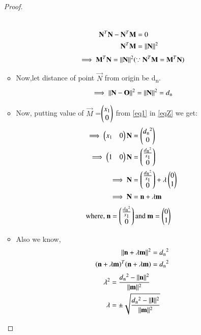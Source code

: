 \documentclass[journal,12pt,twocolumn]{IEEEtran}
\begin{document}
\begin{enumerate}
\begin{proof}
\begin{itemize}
\begin{align}
 \\
  \mathbf{N}^T \mathbf{N} - \mathbf{N}^T \mathbf{M} &= 0  
  \\
   \mathbf{N}^T \mathbf{M} &=\lVert\mathbf{N}\rVert^2
  \end{align}
  \begin{align}
  \implies\mathbf{M}^T \mathbf{N} =\lVert\mathbf{N}\rVert^2 (\because \mathbf{N}^T \mathbf{M}=\mathbf{M}^T \mathbf{N}) \label{eqZ}
  \end{align}
  \item Now,let distance of point $\vec{N}$ from origin be d\textsubscript{n}.
  \begin{align}
  \implies \lVert\mathbf{N}-\mathbf{O}\rVert^2=\lVert\mathbf{N}\rVert^2=d\textsubscript{n}   
  \end{align}
  \item Now, putting value of $\vec{M}$ =$\begin{pmatrix}x\textsubscript{1} \\0\end{pmatrix}$ from \eqref{eq1} in \eqref{eqZ} we get:
  \begin{align}
    \implies   \begin{pmatrix}x\textsubscript{1}&0\end{pmatrix}\mathbf{N} &=\begin{pmatrix}d\textsubscript{n}^2\\0\end{pmatrix}  
    \\
    \implies   \begin{pmatrix}1&0\end{pmatrix}\mathbf{N} &=\begin{pmatrix}\frac{d\textsubscript{n}^2 }{x\textsubscript{1}}\\0\end{pmatrix} 
    \\
    \implies \mathbf{N}&=\begin{pmatrix}\frac{d\textsubscript{n}^2 }{x\textsubscript{1}}\\0\end{pmatrix} +\lambda\begin{pmatrix}0\\1\end{pmatrix}
  \\
    \implies \mathbf{N}&=\mathbf{n}+\lambda\mathbf{m} 
   \end{align}
    \begin{align}
   \text{where, }\mathbf{n}&=\begin{pmatrix}\frac{d\textsubscript{n}^2 }{x\textsubscript{1}}\\0\end{pmatrix} \text{and }\mathbf{m}=\begin{pmatrix}0\\1\end{pmatrix}
   \end{align}
\item Also we know,
\begin{align}
\lVert\mathbf{n}+\lambda\mathbf{m}\rVert^2&=d\textsubscript{n}^2
\\
(\mathbf{n}+\lambda \mathbf{m})^T(\mathbf{n}+\lambda \mathbf{m})&=d\textsubscript{n}^2
\end{align}
\begin{align}
\lambda^2&=\frac{d\textsubscript{n}^2-\lVert\mathbf{n}\rVert^2}{\lVert\mathbf{m}\rVert^2}
\\
\lambda &= \pm \sqrt{\frac{d\textsubscript{n}^2-\lVert\mathbf{l}\rVert^2}{\lVert\mathbf{m}\rVert^2}} 
\end{align}

\end{itemize}
\end{proof}
\end{enumerate}
\end{document}
